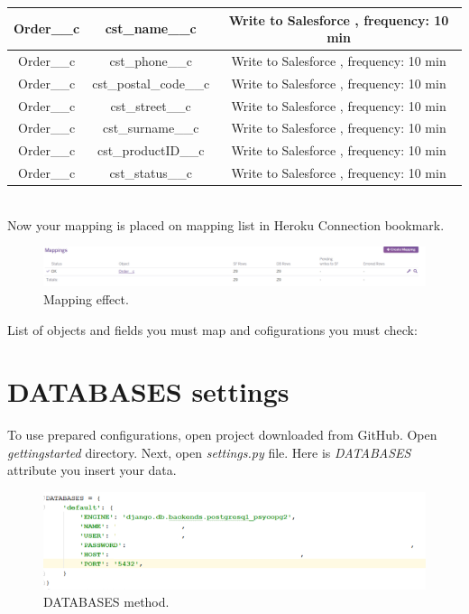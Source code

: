 \documentclass[12pt,a4paper]{article}
\begin{document}
\begin{enumerate}
\begin{tabular}{|c|c|c|}
	\hline			
	Order\_\_c&cst\_name\_\_c&Write to Salesforce , frequency: 10 min\\ 
	\hline	
	Order\_\_c&cst\_phone\_\_c&Write to Salesforce , frequency: 10 min\\ 
	\hline	
	Order\_\_c&cst\_postal\_code\_\_c&Write to Salesforce , frequency: 10 min\\ 
	\hline	
	Order\_\_c&cst\_street\_\_c&Write to Salesforce , frequency: 10 min\\ 
	\hline		
	Order\_\_c&cst\_surname\_\_c&Write to Salesforce , frequency: 10 min\\ 
	\hline	
	Order\_\_c&cst\_productID\_\_c&Write to Salesforce , frequency: 10 min\\ 
	\hline	
	Order\_\_c&cst\_status\_\_c&Write to Salesforce , frequency: 10 min\\ 
	\hline						
	
\end{tabular}\\

Now your mapping is placed on mapping list in Heroku Connection bookmark. 

\begin{figure}[H]
	\centering
	\includegraphics[width=1\textwidth]{images/connect10.PNG}
	\caption{Mapping effect.}
	\label{fig:conj}
\end{figure}

\end{enumerate} 

List of objects and fields you must map and cofigurations you must check:\\


\section{DATABASES settings}
To use prepared configurations, open project downloaded from GitHub. Open \textit{gettingstarted} directory. Next, open \textit{settings.py} file. Here is \textit{DATABASES} attribute you insert your data.  

\begin{figure}[H]
	\centering
	\includegraphics[width=1\textwidth]{images/databases.PNG}
	\caption{DATABASES method.}
	\label{fig:data}
\end{figure}
\end{document}
